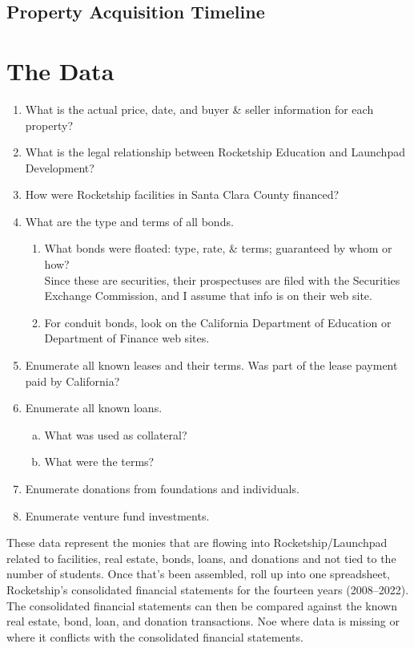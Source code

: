 \subsection{Property Acquisition Timeline}

\section{The Data}
\begin{enumerate}
  \item What is the actual price, date, and buyer \& seller information for each property?
  \item What is the legal relationship between Rocketship Education and Launchpad Development?
  \item How were Rocketship facilities in Santa Clara County financed?
  \item What are the type and terms of all bonds.
  \begin{enumerate}
    \item What bonds were floated: type, rate, \& terms; guaranteed by whom or how? \\
    \noindent Since these are securities, their prospectuses are filed with the Securities Exchange Commission, and I assume that info is on their web site.
    \item For conduit bonds, look on the California Department of Education or Department of Finance web sites.
  \end{enumerate}
  \item Enumerate all known leases and their terms. Was part of the lease payment paid by California?
  \item Enumerate all known loans.
  \begin{enumerate}[a.]
    \item What was used as collateral? 
    \item What were the terms?
  \end{enumerate}    
  \item Enumerate donations from foundations and individuals.
  \item Enumerate venture fund investments.
\end{enumerate}

These data represent the monies that are flowing into Rocketship/Launchpad related to facilities, real estate, bonds, loans, and donations and not tied to the number of students. Once that's been assembled, roll up into one spreadsheet, Rocketship's consolidated financial statements for the fourteen years (2008--2022). The consolidated financial statements can then be compared against the known real estate, bond, loan, and donation transactions. Noe where data is missing or where it conflicts with the consolidated financial statements.

